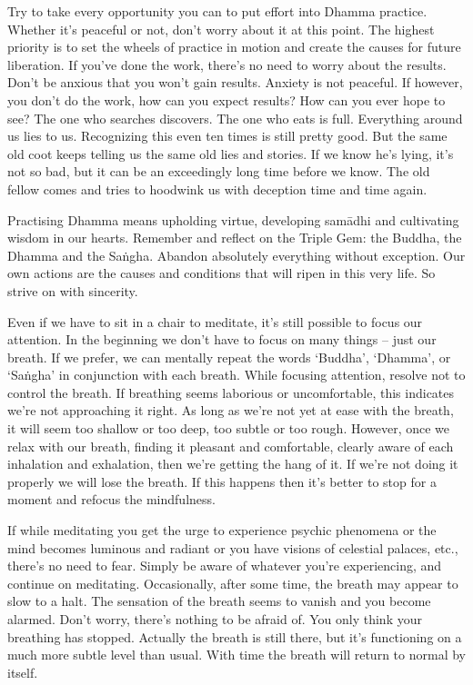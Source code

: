 Try to take every opportunity you can to put effort into Dhamma practice. Whether it's peaceful or not, don't worry about it at this point. The highest priority is to set the wheels of practice in motion and create the causes for future liberation. If you've done the work, there's no need to worry about the results. Don't be anxious that you won't gain results. Anxiety is not peaceful. If however, you don't do the work, how can you expect results? How can you ever hope to see? The one who searches discovers. The one who eats is full. Everything around us lies to us. Recognizing this even ten times is still pretty good. But the same old coot keeps telling us the same old lies and stories. If we know he's lying, it's not so bad, but it can be an exceedingly long time before we know. The old fellow comes and tries to hoodwink us with deception time and time again.

Practising Dhamma means upholding virtue, developing sam\=adhi and cultivating wisdom in our hearts. Remember and reflect on the Triple Gem: the Buddha, the Dhamma and the Sa\.ngha. Abandon absolutely everything without exception. Our own actions are the causes and conditions that will ripen in this very life. So strive on with sincerity.

Even if we have to sit in a chair to meditate, it's still possible to focus our attention. In the beginning we don't have to focus on many things -- just our breath. If we prefer, we can mentally repeat the words `Buddha', `Dhamma', or `Sa\.ngha' in conjunction with each breath. While focusing attention, resolve not to control the breath. If breathing seems laborious or uncomfortable, this indicates we're not approaching it right. As long as we're not yet at ease with the breath, it will seem too shallow or too deep, too subtle or too rough. However, once we relax with our breath, finding it pleasant and comfortable, clearly aware of each inhalation and exhalation, then we're getting the hang of it. If we're not doing it properly we will lose the breath. If this happens then it's better to stop for a moment and refocus the mindfulness.

If while meditating you get the urge to experience psychic phenomena or the mind becomes luminous and radiant or you have visions of celestial palaces, etc., there's no need to fear. Simply be aware of whatever you're experiencing, and continue on meditating. Occasionally, after some time, the breath may appear to slow to a halt. The sensation of the breath seems to vanish and you become alarmed. Don't worry, there's nothing to be afraid of. You only think your breathing has stopped. Actually the breath is still there, but it's functioning on a much more subtle level than usual. With time the breath will return to normal by itself.

